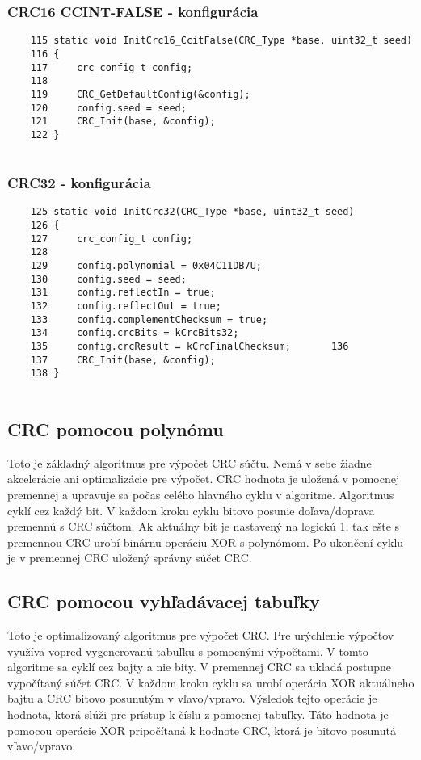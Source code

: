 \documentclass[a4paper, 11pt]{article}
\begin{document}
\subsubsection{CRC16 CCINT-FALSE - konfigurácia}
\begin{lstlisting}
	115 static void InitCrc16_CcitFalse(CRC_Type *base, uint32_t seed)
	116 {   
	117     crc_config_t config;
	118     
	119     CRC_GetDefaultConfig(&config);
	120     config.seed = seed;
	121     CRC_Init(base, &config);
	122 }
	
\end{lstlisting}

\subsubsection{CRC32 - konfigurácia}
	\begin{lstlisting}
	125 static void InitCrc32(CRC_Type *base, uint32_t seed)
	126 {   
	127     crc_config_t config;
	128     
	129     config.polynomial = 0x04C11DB7U;
	130     config.seed = seed;
	131     config.reflectIn = true;
	132     config.reflectOut = true;
	133     config.complementChecksum = true;
	134     config.crcBits = kCrcBits32;
	135     config.crcResult = kCrcFinalChecksum;		136 
	137     CRC_Init(base, &config);
	138 }
	
	\end{lstlisting}





\subsection{CRC pomocou polynómu}
Toto je základný algoritmus pre výpočet CRC súčtu. Nemá v sebe žiadne akcelerácie ani optimalizácie pre výpočet. CRC hodnota je uložená v pomocnej premennej a upravuje sa počas celého hlavného cyklu v algoritme. Algoritmus cyklí cez každý bit. V každom kroku cyklu bitovo posunie doľava/doprava premennú s CRC súčtom. Ak aktuálny bit je nastavený na logickú 1, tak ešte s premennou CRC urobí binárnu operáciu XOR s polynómom. Po ukončení cyklu je v premennej CRC uložený správny súčet CRC.

\subsection{CRC pomocou vyhľadávacej tabuľky}
Toto je optimalizovaný algoritmus pre výpočet CRC. Pre urýchlenie výpočtov využíva vopred vygenerovanú tabuľku s pomocnými výpočtami. V tomto algoritme sa cyklí cez bajty a nie bity. V premennej CRC sa ukladá postupne vypočítaný súčet CRC. V každom kroku cyklu sa urobí operácia XOR aktuálneho bajtu a CRC bitovo posunutým v vľavo/vpravo. Výsledok tejto operácie je hodnota, ktorá slúži pre prístup k číslu z pomocnej tabuľky. Táto hodnota je pomocou operácie XOR pripočítaná k hodnote CRC, ktorá je bitovo posunutá vľavo/vpravo.
\end{document}
